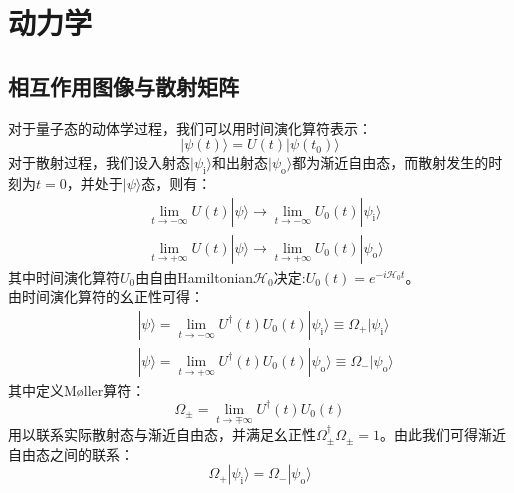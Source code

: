 \chapter{动力学}
\section{相互作用图像与散射矩阵}
对于量子态的动体学过程，我们可以用时间演化算符表示：
\begin{equation}
|\psi(t)\rangle =U(t)|\psi(t_0)\rangle 
\end{equation}
对于散射过程，我们设入射态$|\psi_{\text{i}}\rangle$和出射态$|\psi_{\text{o}}\rangle$都为渐近自由态，而散射发生的时刻为$t=0$，并处于$|\psi\rangle $态，则有：
\begin{equation}
\begin{split}
&\lim\limits_{t\rightarrow-\infty}U(t)|\psi\rangle\rightarrow\lim\limits_{t\rightarrow-\infty}U_0(t)|\psi_{\text{i}}\rangle\\
&\lim\limits_{t\rightarrow+\infty}U(t)|\psi\rangle\rightarrow\lim\limits_{t\rightarrow+\infty}U_0(t)|\psi_{\text{o}}\rangle
\end{split}
\end{equation}
其中时间演化算符$U_0$由自由Hamiltonian$\mathcal{H}_0$决定:$U_0(t)=e^{-i\mathcal{H}_0t}$。\\
由时间演化算符的幺正性可得：
\begin{equation}
\begin{split}
&|\psi\rangle=\lim\limits_{t\rightarrow-\infty}U^{\dagger}(t)U_0(t)|\psi_{\text{i}}\rangle\equiv\Omega_+|\psi_{\text{i}}\rangle\\
&|\psi\rangle=\lim\limits_{t\rightarrow+\infty}U^{\dagger}(t)U_0(t)|\psi_{\text{o}}\rangle\equiv\Omega_-|\psi_{\text{o}}\rangle
\end{split}
\end{equation}
其中定义M\o{}ller算符：
\begin{equation}
\Omega_\pm=\lim\limits_{t\rightarrow\mp\infty}U^{\dagger}(t)U_0(t)
\end{equation}
用以联系实际散射态与渐近自由态，并满足幺正性$\Omega_\pm^\dagger\Omega_\pm=1$。由此我们可得渐近自由态之间的联系：
\begin{equation}
\Omega_+|\psi_{\text{i}}\rangle=\Omega_-|\psi_{\text{o}}\rangle
\end{equation}
